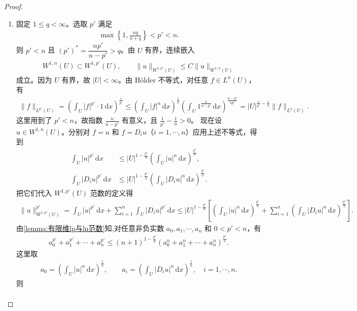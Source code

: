 \documentclass[../../main.tex]{subfiles}
\begin{document}
\begin{proof}
\begin{enumerate}[(1)]
\item 固定 $1\leqslant q<\infty$。选取 $p'$ 满足
\begin{align*}
\max\left\{1,\frac{nq}{n+q}\right\}<p'<n.
\end{align*}
则 $p'<n$ 且 $(p')^{*}=\dfrac{np'}{n-p'}>q$。由 $U$ 有界，连续嵌入
\begin{align}\label{eq::rellich-n-continuous}
W^{1,n}(U)\subset W^{1,p'}(U),\qquad
\|u\|_{W^{1,p'}(U)}\leqslant C\|u\|_{W^{1,n}(U)}
\end{align}
成立。因为 $U$ 有界，故 $|U|<\infty$。由 Hölder 不等式，对任意 $f\in L^{n}(U)$，有
\begin{align*}
\|f\|_{L^{p'}(U)}
=\left(\int_U |f|^{p'}\cdot 1\,\mathrm{d}x\right)^{\frac{1}{p'}}\leqslant\left(\int_U |f|^{n}\,\mathrm{d}x\right)^{\frac{1}{n}}
\left(\int_U 1^{\frac{n}{n-p'}}\,\mathrm{d}x\right)^{\frac{n-p'}{n p'}}=|U|^{\frac{1}{p'}-\frac{1}{n}}\|f\|_{L^{n}(U)}.
\end{align*}
这里用到了 $p'<n$，故指数 $\frac{n}{n-p'}$ 有意义，且 $\frac{1}{p'}-\frac{1}{n}>0$。
现在设 $u\in W^{1,n}(U)$。分别对 $f=u$ 和 $f=D_i u$（$i=1,\cdots,n$）应用上述不等式，得到
\begin{align*}
\int_U |u|^{p'}\,\mathrm{d}x
&\leqslant |U|^{1-\frac{p'}{n}}\left(\int_U |u|^{n}\,\mathrm{d}x\right)^{\frac{p'}{n}},\\
\int_U |D_i u|^{p'}\,\mathrm{d}x
&\leqslant |U|^{1-\frac{p'}{n}}\left(\int_U |D_i u|^{n}\,\mathrm{d}x\right)^{\frac{p'}{n}}.
\end{align*}
把它们代入 $W^{1,p'}(U)$ 范数的定义得
\begin{align*}
\|u\|_{W^{1,p'}(U)}^{p'}
=\int_U|u|^{p'}\,\mathrm{d}x+\sum_{i=1}^{n}\int_U|D_i u|^{p'}\,\mathrm{d}x\leqslant |U|^{1-\frac{p'}{n}}\left[\left(\int_U |u|^{n}\,\mathrm{d}x\right)^{\frac{p'}{n}}
+\sum_{i=1}^{n}\left(\int_U |D_i u|^{n}\,\mathrm{d}x\right)^{\frac{p'}{n}}\right].
\end{align*}
由\cref{lemma:有限维lp与ln范数}知,对任意非负实数 $a_0,a_1,\cdots,a_n$ 和 $0<p'<n$，有
\begin{align*}
a_0^{p'}+a_1^{p'}+\cdots+a_n^{p'}
\leqslant (n+1)^{1-\frac{p'}{n}}\left(a_0^{n}+a_1^{n}+\cdots+a_n^{n}\right)^{\frac{p'}{n}}.
\end{align*}
这里取
\begin{align*}
a_0=\left(\int_U |u|^{n}\,\mathrm{d}x\right)^{\frac{1}{n}},\qquad
a_i=\left(\int_U |D_i u|^{n}\,\mathrm{d}x\right)^{\frac{1}{n}},\quad i=1,\cdots,n.
\end{align*}
则
\begin{align*}

\end{align*}
\end{enumerate}
\end{proof}
\end{document}
